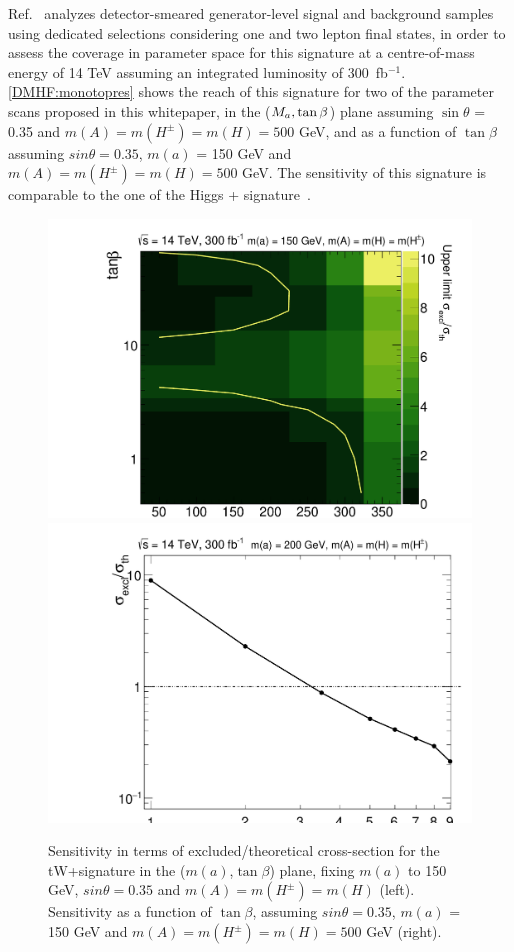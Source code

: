 Ref.~\cite{Pani:2017qyd} analyzes detector-smeared generator-level signal and background samples using dedicated selections considering one and two lepton final states, in order to assess the coverage in parameter space for this signature at a centre-of-mass energy of 14 TeV assuming an integrated luminosity of 300~fb$^{-1}$. 
\autoref{DMHF:monotopres} shows the reach of this signature for two of the parameter scans proposed in this whitepaper, in the ($M_{a},\tan\beta$) plane assuming $\sin\theta$ = 0.35 and $m(A) = m(H^\pm) = m(H) = 500$ GeV, and as a function of $\tan\beta$ assuming $sin\theta = 0.35$, $m(a)$ = 150 GeV and $m(A) = m(H^\pm) = m(H) = 500$ GeV. 
The sensitivity of this signature is comparable to the one of the Higgs + \MET signature~\cite{Bauer:2017ota}. 

\begin{figure}
\centering
\includegraphics[width=.48\textwidth]{texinputs/04_grid/figures/DMHF/SRrec2l_2DSCAN_a}
\includegraphics[width=.47\textwidth]{texinputs/04_grid/figures/DMHF/SR2la_ULscan4}
\caption{Sensitivity in terms of excluded/theoretical cross-section for the tW+\met signature in the ($m(a)$,$\tan\beta$) plane, fixing $m(a)$ to 150 GeV, $sin\theta = 0.35$ and $m(A) = m(H^\pm) = m(H)$ (left). Sensitivity as a function of $\tan\beta$, assuming $sin\theta = 0.35$, $m(a)$ = 150 GeV and $m(A) = m(H^\pm) = m(H) = 500$ GeV (right).}
\label{DMHF:monotopres}
\end{figure}


